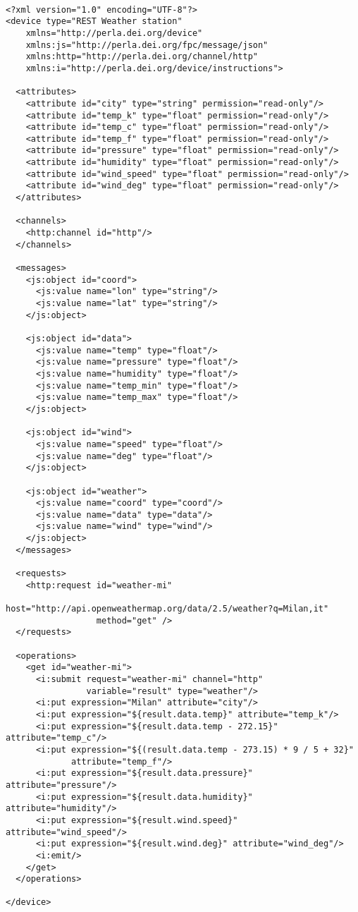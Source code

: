 ~\\
\lstset{language=XML}
\begin{lstlisting}
<?xml version="1.0" encoding="UTF-8"?>
<device type="REST Weather station"
    xmlns="http://perla.dei.org/device"
    xmlns:js="http://perla.dei.org/fpc/message/json"
    xmlns:http="http://perla.dei.org/channel/http"
    xmlns:i="http://perla.dei.org/device/instructions">

  <attributes>
    <attribute id="city" type="string" permission="read-only"/>
    <attribute id="temp_k" type="float" permission="read-only"/>
    <attribute id="temp_c" type="float" permission="read-only"/>
    <attribute id="temp_f" type="float" permission="read-only"/>
    <attribute id="pressure" type="float" permission="read-only"/>
    <attribute id="humidity" type="float" permission="read-only"/>
    <attribute id="wind_speed" type="float" permission="read-only"/>
    <attribute id="wind_deg" type="float" permission="read-only"/>
  </attributes>

  <channels>
    <http:channel id="http"/>
  </channels>

  <messages>
    <js:object id="coord">
      <js:value name="lon" type="string"/>
      <js:value name="lat" type="string"/>
    </js:object>

    <js:object id="data">
      <js:value name="temp" type="float"/>
      <js:value name="pressure" type="float"/>
      <js:value name="humidity" type="float"/>
      <js:value name="temp_min" type="float"/>
      <js:value name="temp_max" type="float"/>
    </js:object>

    <js:object id="wind">
      <js:value name="speed" type="float"/>
      <js:value name="deg" type="float"/>
    </js:object>

    <js:object id="weather">
      <js:value name="coord" type="coord"/>
      <js:value name="data" type="data"/>
      <js:value name="wind" type="wind"/>
    </js:object>
  </messages>

  <requests>
    <http:request id="weather-mi"
                  host="http://api.openweathermap.org/data/2.5/weather?q=Milan,it"
                  method="get" />
  </requests>

  <operations>
    <get id="weather-mi">
      <i:submit request="weather-mi" channel="http"
                variable="result" type="weather"/>
      <i:put expression="Milan" attribute="city"/>
      <i:put expression="${result.data.temp}" attribute="temp_k"/>
      <i:put expression="${result.data.temp - 272.15}" attribute="temp_c"/>
      <i:put expression="${(result.data.temp - 273.15) * 9 / 5 + 32}"
             attribute="temp_f"/>
      <i:put expression="${result.data.pressure}" attribute="pressure"/>
      <i:put expression="${result.data.humidity}" attribute="humidity"/>
      <i:put expression="${result.wind.speed}" attribute="wind_speed"/>
      <i:put expression="${result.wind.deg}" attribute="wind_deg"/>
      <i:emit/>
    </get>
  </operations>

</device>
\end{lstlisting}

